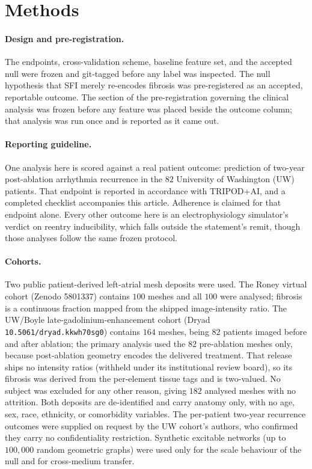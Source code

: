 \documentclass[11pt]{article}
\newcommand{\code}[1]{\texttt{#1}}
\begin{document}
\section{Methods}

\paragraph{Design and pre-registration.} The endpoints, cross-validation scheme,
baseline feature set, and the accepted null were frozen and git-tagged before any
label was inspected. The null hypothesis that SFI merely re-encodes fibrosis was
pre-registered as an accepted, reportable outcome. The section of the
pre-registration governing the clinical analysis was frozen before any feature was
placed beside the outcome column; that analysis was run once and is reported as it
came out.

\paragraph{Reporting guideline.} One analysis here is scored against a real
patient outcome: prediction of two-year post-ablation arrhythmia recurrence in
the $82$ University of Washington (UW) patients. That endpoint
is reported in accordance with TRIPOD+AI\cite{tripodai2024}, and a completed checklist accompanies
this article. Adherence is claimed for that endpoint alone. Every other outcome
here is an electrophysiology simulator's verdict on reentry inducibility, which
falls outside the statement's remit, though those analyses follow the same
frozen protocol.

\paragraph{Cohorts.} Two public patient-derived left-atrial mesh deposits were
used. The Roney virtual cohort\cite{roney2022} (Zenodo 5801337) contains $100$ meshes and all
$100$ were analysed; fibrosis is a continuous fraction mapped from the shipped
image-intensity ratio\cite{khurram2014}. The UW/Boyle late-gadolinium-enhancement cohort\cite{uwboyle2025} (Dryad
\code{10.5061/dryad.kkwh70sg0}) contains $164$ meshes, being $82$ patients imaged
before and after ablation; the primary analysis used the $82$ pre-ablation meshes
only, because post-ablation geometry encodes the delivered treatment. That
release ships no intensity ratios (withheld under its institutional review
board), so its fibrosis was derived from the per-element tissue tags and is
two-valued. No subject was excluded for any other reason, giving $182$ analysed
meshes with no attrition. Both deposits are de-identified and carry anatomy only,
with no age, sex, race, ethnicity, or comorbidity variables. The per-patient
two-year recurrence outcomes were supplied on request by the UW cohort's authors,
who confirmed they carry no confidentiality restriction. Synthetic excitable
networks (up to $100{,}000$ random geometric graphs) were used only for the scale
behaviour of the null and for cross-medium transfer.
\end{document}
